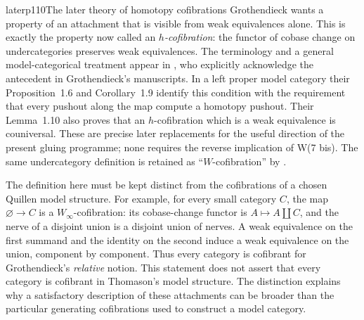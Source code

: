 \begin{dcomment}{later}{p110}{The later theory of homotopy cofibrations}
Grothendieck wants a property of an attachment that is visible from weak equivalences alone. This is exactly the property now called an \emph{$h$-cofibration}: the functor of cobase change on undercategories preserves weak equivalences. The terminology and a general model-categorical treatment appear in \citet[Definition~1.1]{BataninBerger2017}, who explicitly acknowledge the antecedent in Grothendieck's manuscripts. In a left proper model category their Proposition~1.6 and Corollary~1.9 identify this condition with the requirement that every pushout along the map compute a homotopy pushout. Their Lemma~1.10 also proves that an $h$-cofibration which is a weak equivalence is couniversal. These are precise later replacements for the useful direction of the present gluing programme; none requires the reverse implication of W(7 bis). The same undercategory definition is retained as ``$W$-cofibration'' by \citet[Definition~2.1 and Lemma~2.4]{ManettiMeazzini2019}.

The definition here must be kept distinct from the cofibrations of a chosen Quillen model structure. For example, for every small category $C$, the map $\varnothing\to C$ is a $W_\infty$-cofibration: its cobase-change functor is $A\mapsto A\amalg C$, and the nerve of a disjoint union is a disjoint union of nerves. A weak equivalence on the first summand and the identity on the second induce a weak equivalence on the union, component by component. Thus every category is cofibrant for Grothendieck's \emph{relative} notion. This statement does not assert that every category is cofibrant in Thomason's model structure. The distinction explains why a satisfactory description of these attachments can be broader than the particular generating cofibrations used to construct a model category.
\end{dcomment}

